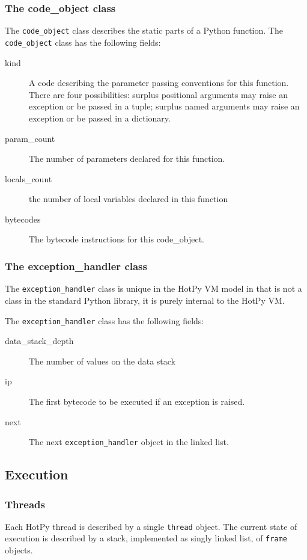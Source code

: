 \subsubsection{The code\_object class}

The \verb|code_object| class describes the static parts of a Python function. The  \verb|code_object| class has the following fields:
\begin{description}
\item[kind] A code describing the parameter passing conventions for this function. There are four possibilities: surplus positional arguments may raise an exception or be passed in a tuple; surplus named arguments may raise an exception or be passed in a dictionary.
\item[param\_count] The number of parameters declared for this function.
\item[locals\_count] the number of local variables declared in this function
\item[bytecodes] The bytecode instructions for this code\_object.
\end{description}

\subsubsection{The exception\_handler class}
The \verb|exception_handler| class is unique in the HotPy VM model in that is not a class in the standard Python library, it is purely internal to the HotPy VM.

The \verb|exception_handler| class has the following fields:
\begin{description}
\item[data\_stack\_depth] The number of values on the data stack
\item[ip] The first bytecode to be executed if an exception is raised.
\item[next] The next \verb|exception_handler| object in the linked list.
\end{description}

\subsection{Execution}

\subsubsection{Threads}

Each HotPy thread is described by a single \verb|thread| object. The current state of execution is described by a stack, implemented as singly linked list, of \verb|frame| objects.

